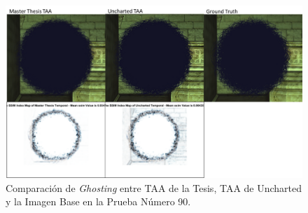 \documentclass[pregrado]{tesis-usb} %
\begin{document}
\begin{figure}[!htb]
	\centering
	\includegraphics[scale=0.8]{images/results/hairball_ghosting_shadow.png}
	\caption{Comparación de \textit{Ghosting} entre TAA de la Tesis, TAA de Uncharted y la Imagen Base en la Prueba Número 90.}\label{fig:hairball_ghosting_shadow}
\end{figure}

\FloatBarrier
\end{document}

